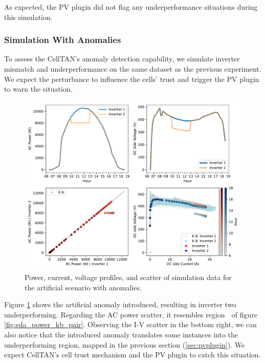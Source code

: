 As expected, the PV plugin did not flag any underperformance situations during this simulation.


\subsubsection{Simulation With Anomalies}

To assess the CellTAN's anomaly detection capability, we simulate inverter mismatch and underperformance on the same dataset as the previous experiment. We expect the perturbance to influence the cells' trust and trigger the PV plugin to warn the situation.

\begin{figure}[h!]
    \centering
    \includegraphics[width=\textwidth]{figures/chapter5/results/artificial/41_test_clone_02.pdf}
    \caption{Power, current, voltage profiles, and scatter of simulation data for the artificial scenario with anomalies.}
    \label{fig:artificial_02_piv}
\end{figure}

Figure \ref{fig:artificial_02_piv} shows the artificial anomaly introduced, resulting in inverter two underperforming. Regarding the AC power scatter, it resembles region \textcircled{} of figure \ref{fig:eda_power_kb_pair}. Observing the I-V scatter in the bottom right, we can also notice that the introduced anomaly translates some instances into the underperforming region, mapped in the previous section (\ref{sec:pvplugin}).
We expect CellTAN's cell trust mechanism and the PV plugin to catch this situation.

